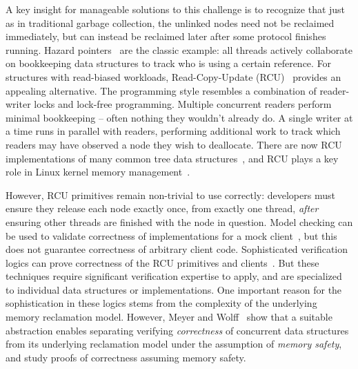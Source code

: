 A key insight for manageable solutions to this challenge is to recognize that just as in traditional garbage collection, the unlinked nodes need not be reclaimed immediately, but can instead be reclaimed later after some protocol finishes running.
Hazard pointers~\cite{Michael:2004:HPS:987524.987595} are the classic example: all threads actively collaborate on bookkeeping data structures to track who is using a certain reference.
For structures with read-biased workloads, Read-Copy-Update (RCU)~\cite{Mckenney:2004:EDD:1048173} provides an appealing alternative. The programming style resembles a combination of reader-writer locks and lock-free programming. 
Multiple concurrent readers perform minimal bookkeeping -- often nothing they wouldn't already do.  A single writer at a time runs in parallel with readers, performing additional work to track which readers may have observed a node they wish to deallocate.
There are now RCU implementations of many common tree data structures~\cite{urcu_ieee,Triplett:2011:RSC:2002181.2002192,DBLP:conf/asplos/ClementsKZ12,mc_report,Arbel:2014:CUR:2611462.2611471,Kung:1980:CMB:320613.320619}, and
RCU plays a key role in Linux kernel memory management~\cite{Mckenney01read-copyupdate}.

However, RCU primitives remain non-trivial to use correctly: developers must ensure they release each node exactly once, from exactly one thread, \emph{after} ensuring other threads are finished with the node in question.
Model checking can be used to validate correctness of implementations for a mock client~\cite{LiangMKM16,Desnoyers:2013:MSM:2506164.2506174,Kokologiannakis:2017:SMC:3092282.3092287,DBLP:conf/cav/AlglaveKT13}, but this does not guarantee correctness of arbitrary client code.
Sophisticated verification logics can prove correctness of the RCU primitives and clients~\cite{Gotsman:2013:VCM:2450268.2450289,fu2010reasoning,verrcu,Mandrykin:2016:TDV:3001219.3001297}.
But these techniques require significant verification expertise to apply, and are specialized to individual data structures or implementations.
One important reason for the sophistication in these logics stems from the complexity of the underlying memory reclamation model. However, Meyer and Wolff~\cite{myr} show that a suitable abstraction enables separating verifying \textit{correctness} of concurrent data structures from its underlying reclamation model under the assumption of \textit{memory safety}, and study proofs of correctness assuming memory safety.

